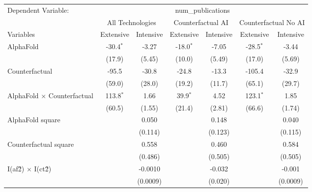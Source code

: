 \begingroup
\centering
\begin{tabular}{lcccccc}
   \tabularnewline \midrule \midrule
   Dependent Variable: & \multicolumn{6}{c}{num\_publications}\\
 & \multicolumn{2}{c}{All Technologies} & \multicolumn{2}{c}{Counterfactual AI} & \multicolumn{2}{c}{Counterfactual No AI} \\
\cmidrule(lr){1-1}\cmidrule(lr){2-3} \cmidrule(lr){4-5} \cmidrule(lr){6-7}
Variables & \multicolumn{1}{c}{Extensive} & \multicolumn{1}{c}{Intensive} & \multicolumn{1}{c}{Extensive} & \multicolumn{1}{c}{Intensive} & \multicolumn{1}{c}{Extensive} & \multicolumn{1}{c}{Intensive} \\
\cmidrule(lr){1-1}\cmidrule(lr){2-2} \cmidrule(lr){3-3} \cmidrule(lr){4-4} \cmidrule(lr){5-5} \cmidrule(lr){6-6} \cmidrule(lr){7-7}
   AlphaFold                          & -30.4$^{*}$ & -3.27    & -18.0$^{*}$ & -7.05   & -28.5$^{*}$ & -3.44\\   
                                      & (17.9)      & (5.45)   & (10.0)      & (5.49)  & (17.0)      & (5.69)\\   
   Counterfactual                     & -95.5       & -30.8    & -24.8       & -13.3   & -105.4      & -32.9\\   
                                      & (59.0)      & (28.0)   & (19.2)      & (11.7)  & (65.1)      & (29.7)\\   
   AlphaFold $\times$ Counterfactual  & 113.8$^{*}$ & 1.66     & 39.9$^{*}$  & 4.52    & 123.1$^{*}$ & 1.85\\   
                                      & (60.5)      & (1.55)   & (21.4)      & (2.81)  & (66.6)      & (1.74)\\   
   AlphaFold square                   &             & 0.050    &             & 0.148   &             & 0.040\\   
                                      &             & (0.114)  &             & (0.123) &             & (0.115)\\   
   Counterfactual square              &             & 0.558    &             & 0.460   &             & 0.584\\   
                                      &             & (0.486)  &             & (0.505) &             & (0.505)\\   
   I(af\^2) $\times$ I(ct\^2)         &             & -0.0010  &             & -0.032  &             & -0.001\\   
                                      &             & (0.0009) &             & (0.020) &             & (0.0009)\\   

\end{tabular}
